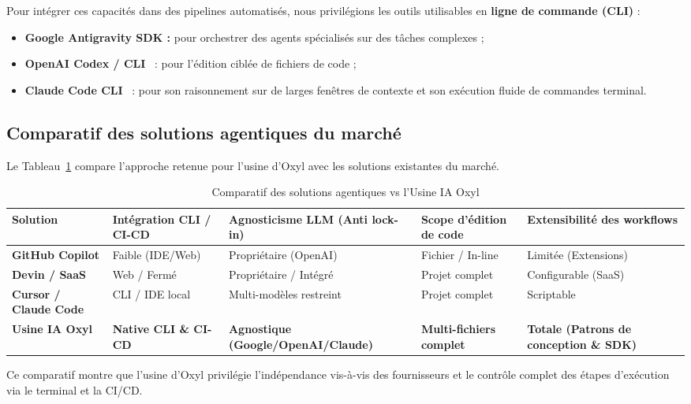 \documentclass{tnreport}
\begin{document}
Pour intégrer ces capacités dans des pipelines automatisés, nous privilégions les outils utilisables en \textbf{ligne de commande (CLI)} :
\begin{itemize}
    \item \textbf{Google Antigravity SDK :} pour orchestrer des agents spécialisés sur des tâches complexes ;
    \item \textbf{OpenAI Codex / CLI}~\cite{chen2021codex} : pour l'édition ciblée de fichiers de code ;
    \item \textbf{Claude Code CLI}~\cite{anthropic2024claude} : pour son raisonnement sur de larges fenêtres de contexte et son exécution fluide de commandes terminal.
\end{itemize}

\subsection{Comparatif des solutions agentiques du marché}
\label{subsec:comparatif_marche}

Le Tableau~\ref{tab:comparatif_agents} compare l'approche retenue pour l'usine d'Oxyl avec les solutions existantes du marché.

\begin{table}[htbp]
\centering
\caption{Comparatif des solutions agentiques vs l'Usine IA Oxyl}
\label{tab:comparatif_agents}
\footnotesize
\begin{tabularx}{\textwidth}{|l|X|X|X|X|}
\hline
\textbf{Solution} & \textbf{Intégration CLI / CI-CD} & \textbf{Agnosticisme LLM (Anti lock-in)} & \textbf{Scope d'édition de code} & \textbf{Extensibilité des workflows} \\ \hline
\textbf{GitHub Copilot} & Faible (IDE/Web) & Propriétaire (OpenAI) & Fichier / In-line & Limitée (Extensions) \\ \hline
\textbf{Devin / SaaS} & Web / Fermé & Propriétaire / Intégré & Projet complet & Configurable (SaaS) \\ \hline
\textbf{Cursor / Claude Code} & CLI / IDE local & Multi-modèles restreint & Projet complet & Scriptable \\ \hline
\textbf{Usine IA Oxyl} & \textbf{Native CLI \& CI-CD} & \textbf{Agnostique (Google/OpenAI/Claude)} & \textbf{Multi-fichiers complet} & \textbf{Totale (Patrons de conception \& SDK)} \\ \hline
\end{tabularx}
\end{table}

Ce comparatif montre que l'usine d'Oxyl privilégie l'indépendance vis-à-vis des fournisseurs et le contrôle complet des étapes d'exécution via le terminal et la CI/CD.
\end{document}
